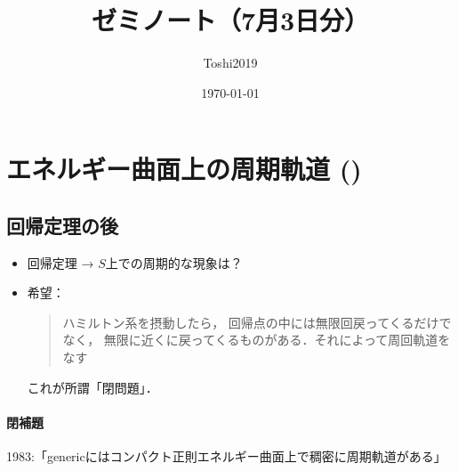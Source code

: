 \newcommand{\cotn}[1][]{\dot{T}^{\ast}{#1}}


\newcommand{\muhom}{\mu hom}
\newcommand{\muHom}[1][]{\mathrm{Hom}^\mu_{\raise1.5ex\hbox to.1em{}#1}}

\newcommand{\mucat}[2][]{\mathsf{D}^{\mathrm{b}}_{#1}(#2)}

\newcommand{\conv}[1][]{\mathbin{\mathop{\circ}\limits_{#1}}}

\newcommand{\torus}{\mathbf{T}}

\newcommand{\const}{\mathrm{const.}}
\newcommand{\norm}[1][]{\left\lVert{#1}\right\rVert}
\newcommand{\abs}[1][]{\left\lvert{#1}\right\rvert}




\title{ゼミノート（7月3日分）}
\author{Toshi2019}
\date{\today}

\maketitle
\tableofcontents

\section{エネルギー曲面上の周期軌道 (\cite[\S1.4]{HZ94})}

\subsection*{回帰定理の後}

\begin{itemize}
    \item 回帰定理 → \(S\)上での周期的な現象は？
    \item 希望：\begin{quote}
        ハミルトン系を摂動したら，
        回帰点の中には無限回戻ってくるだけでなく，
        無限に近くに戻ってくるものがある．それによって周回軌道をなす
    \end{quote}これが所謂「閉問題」．
\end{itemize}

\paragraph{閉補題}1983:「genericにはコンパクト正則エネルギー曲面上で稠密に周期軌道がある」

